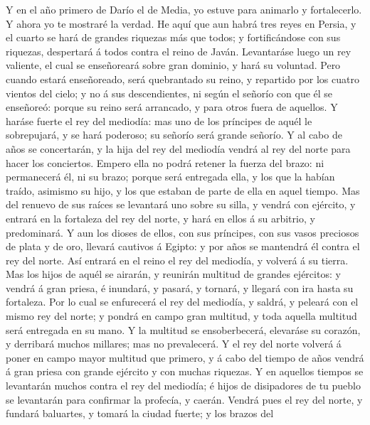  Y en el año primero de Darío el de Media, yo estuve para
animarlo y fortalecerlo.  Y ahora yo te mostraré la
verdad. He aquí que aun habrá tres reyes en Persia, y el cuarto se hará
de grandes riquezas más que todos; y fortificándose con sus riquezas,
despertará á todos contra el reino de Javán.  Levantaráse
luego un rey valiente, el cual se enseñoreará sobre gran dominio, y hará
su voluntad.  Pero cuando estará enseñoreado, será
quebrantado su reino, y repartido por los cuatro vientos del cielo; y no
á sus descendientes, ni según el señorío con que él se enseñoreó: porque
su reino será arrancado, y para otros fuera de aquellos. 
Y haráse fuerte el rey del mediodía: mas uno de los príncipes de aquél
le sobrepujará, y se hará poderoso; su señorío será grande señorío.
 Y al cabo de años se concertarán, y la hija del rey del
mediodía vendrá al rey del norte para hacer los conciertos. Empero ella
no podrá retener la fuerza del brazo: ni permanecerá él, ni su brazo;
porque será entregada ella, y los que la habían traído, asimismo su
hijo, y los que estaban de parte de ella en aquel tiempo. 
Mas del renuevo de sus raíces se levantará uno sobre su silla, y vendrá
con ejército, y entrará en la fortaleza del rey del norte, y hará en
ellos á su arbitrio, y predominará.  Y aun los dioses de
ellos, con sus príncipes, con sus vasos preciosos de plata y de oro,
llevará cautivos á Egipto: y por años se mantendrá él contra el rey del
norte.  Así entrará en el reino el rey del mediodía, y
volverá á su tierra.  Mas los hijos de aquél se airarán,
y reunirán multitud de grandes ejércitos: y vendrá á gran priesa, é
inundará, y pasará, y tornará, y llegará con ira hasta su fortaleza.
 Por lo cual se enfurecerá el rey del mediodía, y saldrá,
y peleará con el mismo rey del norte; y pondrá en campo gran multitud, y
toda aquella multitud será entregada en su mano.  Y la
multitud se ensoberbecerá, elevaráse su corazón, y derribará muchos
millares; mas no prevalecerá.  Y el rey del norte volverá
á poner en campo mayor multitud que primero, y á cabo del tiempo de años
vendrá á gran priesa con grande ejército y con muchas riquezas.
 Y en aquellos tiempos se levantarán muchos contra el rey
del mediodía; é hijos de disipadores de tu pueblo se levantarán para
confirmar la profecía, y caerán.  Vendrá pues el rey del
norte, y fundará baluartes, y tomará la ciudad fuerte; y los brazos del

